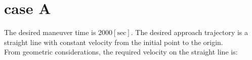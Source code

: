 \documentclass[11pt, a4paper]{article}
\begin{document}

\newpage
\section{case A}
The desired maneuver time is $2000\left[\mathrm{sec}\right]$. The desired approach trajectory is a straight line with constant velocity from the initial point to the origin. \\
From geometric considerations, the required velocity on the straight line is:
\end{document}
